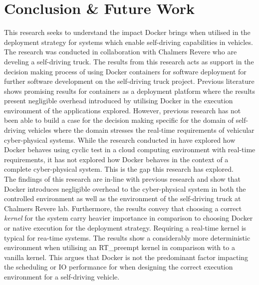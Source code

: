 \iffalse  \fi
\chapter{Conclusion \& Future Work} \label{section:conclusion}

This research seeks to understand the impact Docker brings when utilised in the deployment strategy for systems which enable self-driving capabilities in vehicles. The research was conducted in collaboration with Chalmers Revere who are develing a self-driving truck. The results from this research acts as support in the decision making process of using Docker containers for software deployment for further software development on the self-driving truck project. Previous literature \cite{p6,c2,p3,p4,p7,c1} shows promising results for containers as a deployment platform where the results present negligible overhead introduced by utilising Docker in the execution environment of the applications explored. However, previous research has not been able to build a case for the decision making specific for the domain of self-driving vehicles where the domain stresses the real-time requirements of vehicular cyber-physical systems. While the research conducted in \cite{p1} have explored how Docker behaves using cyclic test in a cloud computing environment with real-time requirements, it has not explored how Docker behaves in the context of a complete cyber-physical system. This is the gap this research has explored.\\

The findings of this research are in-line with previous research and show that Docker introduces negligible overhead to the cyber-physical system in both the controlled environment as well as the environment of the self-driving truck at Chalmers Revere lab. Furthermore, the results convey that choosing a correct \textit{kernel} for the system carry heavier importance in comparison to choosing Docker or native execution for the deployment strategy. Requiring a real-time kernel is typical for rea-time systems. The results show a considerably more deterministic environment when utilising an RT\_preempt kernel in comparison with to a vanilla kernel. This argues that Docker is not the predominant factor impacting the scheduling or IO performance for when designing the correct execution environment for a self-driving vehicle.\\


